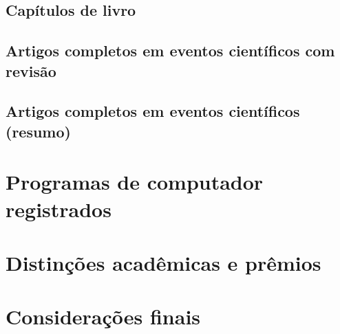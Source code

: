 

\subsection{Capítulos de livro}



\subsection{Artigos completos em eventos científicos com revisão}



\subsection{Artigos completos em eventos científicos (resumo)}



\section{Programas de computador registrados}



\section{Distinções acadêmicas e prêmios}



\section{Considerações finais}


